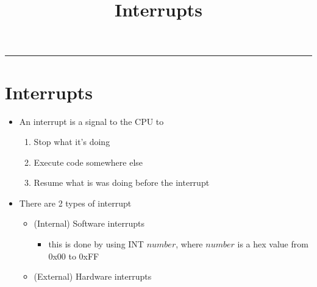 \documentclass{article}
\title{Interrupts}
\begin{document}
\maketitle

\begin{center}\rule{0.5\textwidth}{0.4pt}\end{center}

\section{Interrupts}
\begin{itemize}
  \item{An interrupt is a signal to the CPU to}
  \begin{enumerate}
    \item{Stop what it's doing}
    \item{Execute code somewhere else}
    \item{Resume what is was doing before the interrupt}
  \end{enumerate}
  \item{There are 2 types of interrupt}
  \begin{itemize}
    \item{(Internal) Software interrupts}
    \begin{itemize}
      \item{this is done by using INT $number$, where $number$ is a hex value from 0x00 to 0xFF}
    \end{itemize}
    \item{(External) Hardware interrupts}
  \end{itemize}
\end{itemize}
\end{document}

